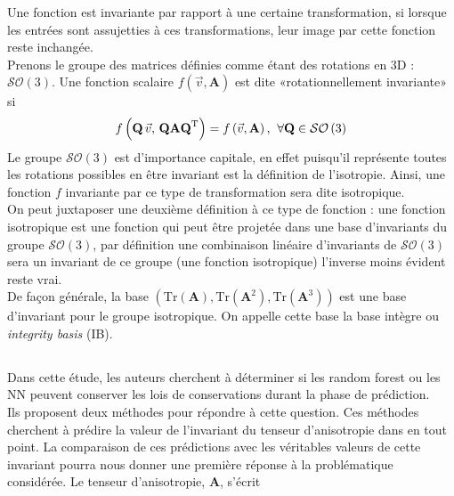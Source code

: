 \documentclass[a4paper,12pt]{report}
\newcommand{\rap}{par rapport}
\numberwithin{equation}{section} %
\begin{document}
Une fonction est invariante \rap $ $ à une certaine transformation, si lorsque les entrées sont assujetties à ces transformations, leur image par cette fonction reste inchangée.\\
Prenons le groupe des matrices définies comme étant des rotations en 3D : $\mathcal{SO} \left( 3 \right)$. 
Une fonction scalaire $f\left(\vec{v}, \textbf{A} \right)$ est dite «rotationnellement invariante» si 
\begin{equation*}
f\left( \textbf{Q}\,\vec{v}, \, \textbf{Q} \textbf{A} \textbf{Q}^{\text{T}}\right) = f\left (\vec{v}, \mathbf{A} \right) \text{,\hspace{2mm}} \forall \textbf{Q} \in \mathcal{SO}\left ( 3\right )  
\end{equation*}
Le groupe $\mathcal{SO} \left( 3 \right)$ est d'importance capitale, en effet puisqu'il représente toutes les rotations possibles en être invariant est la définition de l'isotropie. Ainsi, une fonction $f$ invariante par ce type de transformation sera dite isotropique.\\
On peut juxtaposer une deuxième définition à ce type de fonction : une fonction isotropique est une fonction qui peut être projetée dans une base d'invariants du groupe $\mathcal{SO} \left( 3 \right)$, par définition une combinaison linéaire d'invariants de $\mathcal{SO} \left( 3 \right)$ sera un invariant de ce groupe (une fonction isotropique) l'inverse moins évident reste vrai.\\
De façon générale, la base $\left( \text{Tr}\left( \mathbf{A}\right), \text{Tr}\left( \mathbf{A}^2\right), \text{Tr}\left( \mathbf{A}^3\right) \right ) $ est une base d'invariant pour le groupe isotropique. On appelle cette base la base intègre ou \textit{integrity basis} (IB). \\

\newpage

\subsection*{ \cite{ling2016machine}}  
\noindent Dans cette étude, les auteurs cherchent à déterminer si les random forest ou les NN peuvent conserver les lois de conservations durant la phase de prédiction. \\
Ils proposent deux méthodes pour répondre à cette question. Ces méthodes cherchent à prédire la valeur de l'invariant du tenseur d'anisotropie dans en tout point. La comparaison de ces prédictions avec les véritables valeurs de cette invariant pourra nous donner une première réponse à la problématique considérée. Le tenseur d'anisotropie, \textbf{A}, s'écrit  
\end{document}
